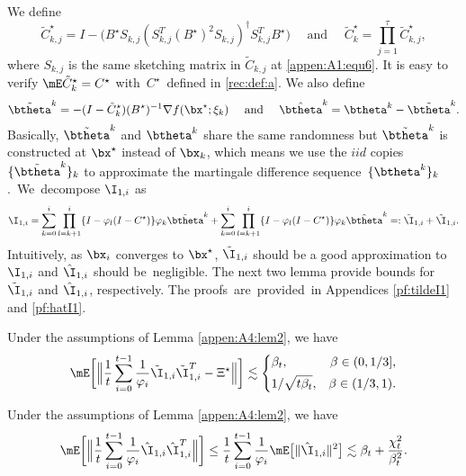 We define
\begin{equation}\label{Ctildestar}
\tilde{C}^\star_{k,j}=I-\big(B^\star S_{k,j}(S_{k,j}^T(B^\star)^2S_{k,j})^{\dagger}S_{k,j}^TB^\star\big)\quad \text{ and }\quad \tilde{C}^\star_k = \prod_{j=1}^\tau \tilde{C}^\star_{k,j},
\end{equation}
where $S_{k,j}$ is the same sketching matrix in $\tilde{C}_{k,j}$ at \eqref{appen:A1:equ6}. It is easy to verify $\mE\tilde{C}_k^\star = C^\star$ with~$C^\star$~defined in \eqref{rec:def:a}. We also define 
\begin{equation}\label{appen:A4:equ3}
\tilde{\btheta}^k = -(I-\tilde{C}^\star_k)(B^{\star})^{-1}\nabla f(\bx^\star;\xi_k)\quad \text{ and }\quad \hat{\btheta}^k = \btheta^k-\tilde{\btheta}^k.
\end{equation}
Basically, $\tilde{\btheta}^k$ and $\btheta^k$ share the same randomness but $\tilde{\btheta}^k$ is constructed at $\bx^\star$ instead of $\bx_k$, which means we use the $iid$ copies $\{\tilde{\btheta}^k\}_k$ to approximate the martingale difference sequence~$\{\btheta^k\}_k$.~We~decompose $\I_{1,i}$ as
\begin{equation}\label{appen:A4:equ2}
\I_{1,i} = \sum_{k=0}^i\prod_{l=k+1}^i\{I-\varphi_l(I-C^\star)\}\varphi_k \tilde{\btheta}^k + \sum_{k=0}^i\prod_{l=k+1}^i\{I-\varphi_l(I-C^\star)\}\varphi_k \hat{\btheta}^k =:  \tilde{\I}_{1,i} +\hat{\I}_{1,i}.
\end{equation}
Intuitively, as $\bx_i$ converges to $\bx^\star$, $\tilde{\I}_{1,i}$ should be a good approximation to $\I_{1,i}$ and $\hat{\I}_{1,i}$ should be~negligible. The next two lemma provide bounds for $\tilde{\I}_{1,i}$ and $\hat{\I}_{1,i}$, respectively. The proofs~are~provided~in Appendices \ref{pf:tildeI1} and \ref{pf:hatI1}.


\begin{lemma}\label{appen:A4:lem3}
Under the assumptions of Lemma \ref{appen:A4:lem2}, we have
\begin{equation*}
\mE\bigg[\Big\|\frac{1}{t}\sum_{i=0}^{t-1}\frac{1}{\varphi_i}\tilde{\I}_{1,i}\tilde{\I}_{1,i}^T-\Xi^\star\Big\|\bigg] \lesssim \left\{\begin{aligned}
&\beta_t, &\beta\in(0,1/3],\\
&1/\sqrt{t\beta_t}, &\beta\in(1/3,1).  
\end{aligned}\right.
\end{equation*}
\end{lemma}

\begin{lemma}\label{appen:A4:lem4}
Under the assumptions of Lemma \ref{appen:A4:lem2}, we have
\begin{equation*}
\mE\bigg[\Big\|\frac{1}{t}\sum_{i=0}^{t-1}\frac{1}{\varphi_i}\hat{\I}_{1,i}\hat{\I}_{1,i}^T\Big\|\bigg]\leq\frac{1}{t}\sum_{i=0}^{t-1} \frac{1}{\varphi_i} \mE\big[\|\hat{\I}_{1,i}\|^2\big] \lesssim \beta_t + \frac{\chi_t^2}{\beta_t^2}.
\end{equation*}
\end{lemma}


